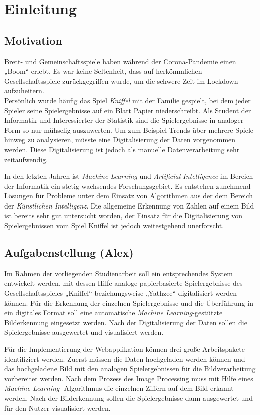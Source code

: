 \chapter{Einleitung}
\section{Motivation}
Brett- und Gemeinschaftsspiele haben während der Corona-Pandemie einen „Boom“ erlebt. Es war keine Seltenheit, dass auf herkömmlichen Gesellschaftsspiele zurückgegriffen wurde, um die schwere Zeit im Lockdown aufzuheitern. \cite{dw_2021}\\
Persönlich wurde häufig das Spiel \textit{Kniffel} mit der Familie gespielt, bei dem jeder Spieler seine Spielergebnisse auf ein Blatt Papier niederschreibt. Als Student der Informatik und Interessierter der Statistik sind die Spielergebnisse in analoger Form so nur mühselig auszuwerten. Um zum Beispiel Trends über mehrere Spiele hinweg zu analysieren, müsste eine Digitalisierung der Daten vorgenommen werden. Diese Digitalisierung ist jedoch als manuelle Datenverarbeitung sehr zeitaufwendig.

In den letzten Jahren ist \textit{Machine Learning} und \textit{Artificial Intelligence} im Bereich der Informatik ein stetig wachsendes Forschungsgebiet. 
Es entstehen zunehmend Lösungen für Probleme unter dem Einsatz von Algorithmen aus der dem Bereich der \textit{Künstlichen Intelligenz}. Die allgemeine Erkennung von Zahlen auf einem Bild ist bereits sehr gut untersucht worden, der Einsatz für die Digitalisierung von Spielergebnissen vom Spiel Kniffel ist jedoch weitestgehend unerforscht. 

\section{Aufgabenstellung (Alex)}
Im Rahmen der vorliegenden Studienarbeit soll ein entsprechendes System entwickelt werden, mit dessen Hilfe analoge papierbasierte Spielergebnisse des
Gesellschaftsspieles „Kniffel“ beziehungsweise „Yathzee“ digitalisiert werden können. Für die Erkennung der einzelnen Spielergebnisse und die Überführung in ein digitales Format soll eine automatische \textit{Machine Learning}-gestützte Bilderkennung eingesetzt werden. Nach der Digitalisierung der Daten sollen die Spielergebnisse ausgewertet und visualisiert werden.

Für die Implementierung der Webapplikation können drei große Arbeitspakete identifiziert werden. Zuerst müssen die Daten hochgeladen werden können und das hochgeladene Bild mit den analogen Spielergebnissen für die Bildverarbeitung vorbereitet werden. Nach dem Prozess des Image Processing muss mit Hilfe eines \textit{Machine Learning}-
Algorithmus die einzelnen Ziffern auf dem Bild erkannt werden.
Nach der Bilderkennung sollen die Spielergebnisse dann ausgewertet und für den Nutzer visualisiert werden.

